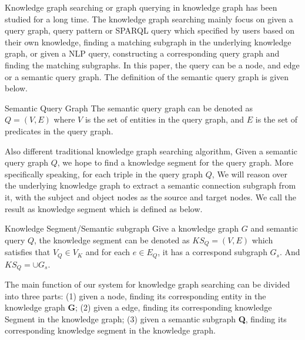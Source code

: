 

Knowledge graph searching or graph querying in knowledge graph has been studied for a long time. 
The knowledge graph searching mainly focus on given a query graph, query pattern or SPARQL query which specified by users based on their own knowledge, finding a matching subgraph in the underlying knowledge graph, or given a NLP query, constructing a corresponding query graph and finding the matching subgraphs. 
In this paper, the query can be a node, and edge or a semantic query graph. The definition of the semantic query graph is given below.

\begin{definition}{Semantic Query Graph}
The semantic query graph can be denoted as $Q=(V, E)$ where $V$ is the set of entities in the query graph, and $E$ is the set of predicates in the query graph.
\end{definition}

Also different traditional knowledge graph searching algorithm, Given a semantic query graph $Q$, we hope to find a knowledge segment for the query graph. More specifically speaking, for each triple in the query graph $Q$, We will reason over the underlying knowledge graph to extract a semantic connection subgraph from it, with the subject and object nodes as the source and target nodes. We call the result as knowledge segment which is defined as below.

\begin{definition}{Knowledge Segment/Semantic subgraph}
Give a knowledge graph $G$ and semantic query $Q$, the knowledge segment can be denoted as $KS_Q = (V, E)$ which satisfies that $V_Q \in V_K$ and for each $e \in E_Q$, it has a correspond subgraph $G_s$. And $KS_Q = \cup G_s$.
\end{definition}


The main function of our system for knowledge graph searching can be divided into three parts: (1) given a node, finding its corresponding entity in the knowledge graph \textbf{G}; (2) given a edge, finding its corresponding knowledge Segment in the knowledge graph; (3) given a semantic subgraph \textbf{Q}, finding its corresponding knowledge segment in the knowledge graph.


